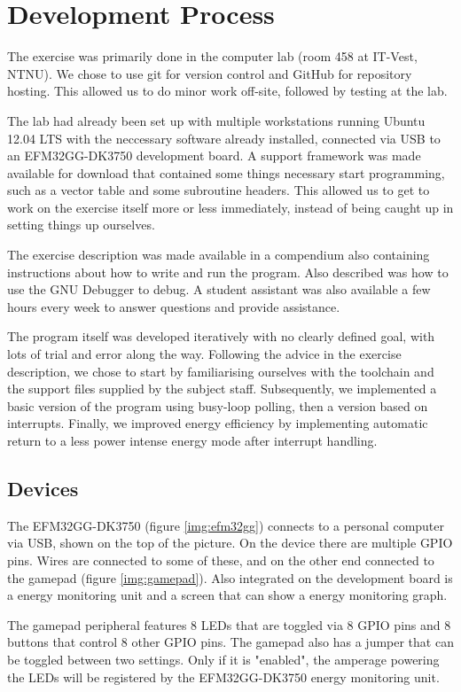 \section{Development Process}
The exercise was primarily done in the computer lab (room 458 at IT-Vest, NTNU). We chose to use git for version control and GitHub for repository hosting. This allowed us to do minor work off-site, followed by testing at the lab.

The lab had already been set up with multiple workstations running Ubuntu 12.04 LTS with the neccessary software already installed, connected via USB to an EFM32GG-DK3750 development board. A support framework was made available for download that contained some things necessary start programming, such as a vector table and some subroutine headers. This allowed us to get to work on the exercise itself more or less immediately, instead of being caught up in setting things up ourselves.

The exercise description was made available in a compendium also containing instructions about how to write and run the program. Also described was how to use the GNU Debugger to debug. A student assistant was also available a few hours every week to answer questions and provide assistance.

The program itself was developed iteratively with no clearly defined goal, with lots of trial and error along the way. Following the advice in the exercise description, we chose to start by familiarising ourselves with the toolchain and the support files supplied by the subject staff. Subsequently, we implemented a basic version of the program using busy-loop polling, then a version based on interrupts. Finally, we improved energy efficiency by implementing automatic return to a less power intense energy mode after interrupt handling.

\subsection{Devices}
The EFM32GG-DK3750 (figure \ref{img:efm32gg}) connects to a personal computer via USB, shown on the top of the picture. On the device there are multiple GPIO pins. Wires are connected to some of these, and on the other end connected to the gamepad (figure \ref{img:gamepad}). Also integrated on the development board is a energy monitoring unit and a screen that can show a energy monitoring graph.

The gamepad peripheral features 8 LEDs that are toggled via 8 GPIO pins and 8 buttons that control 8 other GPIO pins. The gamepad also has a jumper that can be toggled between two settings. Only if it is "enabled", the amperage powering the LEDs will be registered by the EFM32GG-DK3750 energy monitoring unit.

